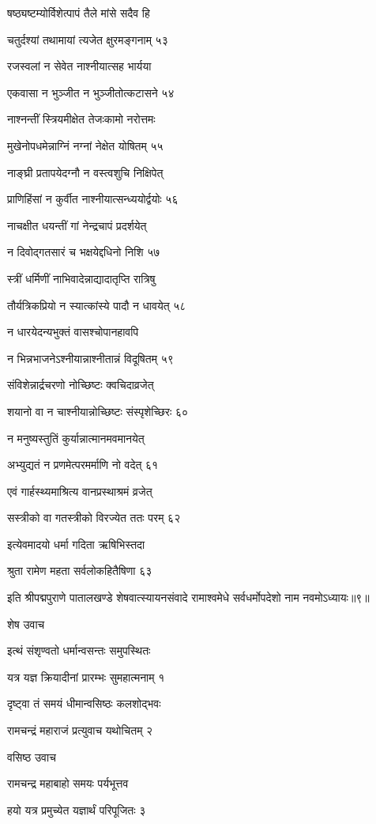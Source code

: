 षष्ठ्यष्टम्योर्विशेत्पापं तैले मांसे सदैव हि

चतुर्दश्यां तथामायां त्यजेत क्षुरमङ्गनाम् ५३

रजस्वलां न सेवेत नाश्नीयात्सह भार्यया

एकवासा न भुञ्जीत न भुञ्जीतोत्कटासने ५४

नाश्नन्तीं स्त्रियमीक्षेत तेजःकामो नरोत्तमः

मुखेनोपधमेन्नाग्निं नग्नां नेक्षेत योषितम् ५५

नाङ्घ्री प्रतापयेदग्नौ न वस्त्वशुचि निक्षिपेत्

प्राणिहिंसां न कुर्वीत नाश्नीयात्सन्ध्ययोर्द्वयोः ५६

नाचक्षीत धयन्तीं गां नेन्द्रचापं प्रदर्शयेत्

न दिवोद्गतसारं च भक्षयेद्दधिनो निशि ५७

स्त्रीं धर्मिणीं नाभिवादेन्नाद्यादातृप्ति रात्रिषु

तौर्यत्रिकप्रियो न स्यात्कांस्ये पादौ न धावयेत् ५८

न धारयेदन्यभुक्तं वासश्चोपानहावपि

न भिन्नभाजनेऽश्नीयान्नाश्नीतान्नं विदूषितम् ५९

संविशेन्नार्द्रचरणो नोच्छिष्टः क्वचिदाव्रजेत्

शयानो वा न चाश्नीयान्नोच्छिष्टः संस्पृशेच्छिरः ६०

न मनुष्यस्तुतिं कुर्यान्नात्मानमवमानयेत्

अभ्युद्यतं न प्रणमेत्परमर्माणि नो वदेत् ६१

एवं गार्हस्थ्यमाश्रित्य वानप्रस्थाश्रमं व्रजेत्

सस्त्रीको वा गतस्त्रीको विरज्येत ततः परम् ६२

इत्येवमादयो धर्मा गदिता ऋषिभिस्तदा

श्रुता रामेण महता सर्वलोकहितैषिणा ६३

इति श्रीपद्मपुराणे पातालखण्डे शेषवात्स्यायनसंवादे रामाश्वमेधे सर्वधर्मोपदेशो नाम नवमोऽध्यायः॥९॥


शेष उवाच

इत्थं संशृण्वतो धर्मान्वसन्तः समुपस्थितः

यत्र यज्ञ क्रियादीनां प्रारम्भः सुमहात्मनाम् १

दृष्ट्वा तं समयं धीमान्वसिष्ठः कलशोद्भवः

रामचन्द्रं महाराजं प्रत्युवाच यथोचितम् २

वसिष्ठ उवाच

रामचन्द्र महाबाहो समयः पर्यभूत्तव

हयो यत्र प्रमुच्येत यज्ञार्थं परिपूजितः ३

